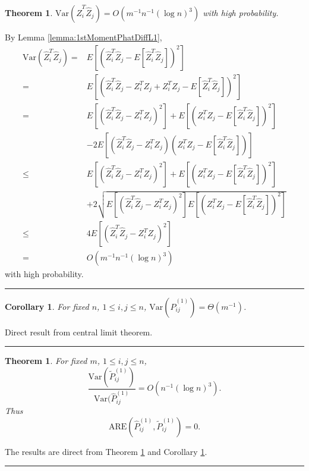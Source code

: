 \documentclass[a4paper]{article}
\newenvironment{proof}{{\bf Proof:  }}{\hfill\rule{2mm}{2mm}}
\newtheorem{theorem}[fact]{Theorem}
\newtheorem{corollary}[fact]{Corollary}
\begin{document}
\begin{theorem}
\label{thm:VarASEL1}
$\mathrm{Var}(\hat{Z}_i^T \hat{Z}_j) = O(m^{-1} n^{-1} (\log n)^3)$ with high probability.
\end{theorem}
\begin{proof}
By Lemma \ref{lemma:1stMomentPhatDiffL1},
\begin{align*}
	\mathrm{Var}(\hat{Z}_i^T \hat{Z}_j)
    = & E[(\hat{Z}_i^T \hat{Z}_j - E[\hat{Z}_i^T \hat{Z}_j])^2] \\
    = & E[(\hat{Z}_i^T \hat{Z}_j - Z_i^T Z_j + Z_i^T Z_j - E[\hat{Z}_i^T \hat{Z}_j])^2] \\
    = & E[(\hat{Z}_i^T \hat{Z}_j - Z_i^T Z_j)^2] + E[(Z_i^T Z_j - E[\hat{Z}_i^T \hat{Z}_j])^2] \\ 
    & - 2E[(\hat{Z}_i^T \hat{Z}_j - Z_i^T Z_j)(Z_i^T Z_j - E[\hat{Z}_i^T \hat{Z}_j])] \\
    \le & E[(\hat{Z}_i^T \hat{Z}_j - Z_i^T Z_j)^2] + E[(Z_i^T Z_j - E[\hat{Z}_i^T \hat{Z}_j])^2] \\ 
    & + 2\sqrt{E[(\hat{Z}_i^T \hat{Z}_j - Z_i^T Z_j)^2] E[(Z_i^T Z_j - E[\hat{Z}_i^T \hat{Z}_j])^2]} \\
    \le & 4 E[(\hat{Z}_i^T \hat{Z}_j - Z_i^T Z_j)^2] \\
    = & O(m^{-1} n^{-1} (\log n)^3)
\end{align*}
with high probability.
\end{proof}



\begin{corollary}
\label{cor:VarL1}
For fixed $n$, $1 \le i,j \le n$, $\mathrm{Var}(\hat{P}^{(1)}_{ij}) = \Theta(m^{-1})$.
\end{corollary}
\begin{proof}
Direct result from central limit theorem.
\end{proof}




\begin{theorem}
\label{thm:AREL1}
For fixed $m$, $1 \le i, j \le n$,
\[
	\frac{\mathrm{Var}(\widetilde{P}_{ij}^{(1)})}{\mathrm{Var}(\hat{P}_{ij}^{(1)}}
    = O(n^{-1} (\log n)^3).
\]
Thus
\[
	\mathrm{ARE}(\hat{P}_{ij}^{(1)}, \widetilde{P}_{ij}^{(1)}) = 0.
\]
\end{theorem}
\begin{proof}
The results are direct from Theorem \ref{thm:VarASEL1} and Corollary \ref{cor:VarL1}.
\end{proof}
\end{document}
